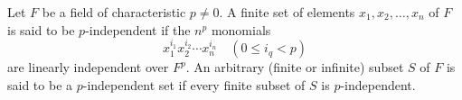 Let $F$ be a field of characteristic $p \neq 0$. A finite set of elements $x_1, x_2, \ldots, x_n$ of $F$ is said to be $p$-independent if the $n^p$ monomials
$$x_1^{i_1} x_2^{i_2} \cdots x_n^{i_n} \quad (0 \leq i_q < p)$$
are linearly independent over $F^p$. An arbitrary (finite or infinite) subset $S$ of $F$ is said to be a $p$-independent set if every finite subset of $S$ is $p$-independent.

